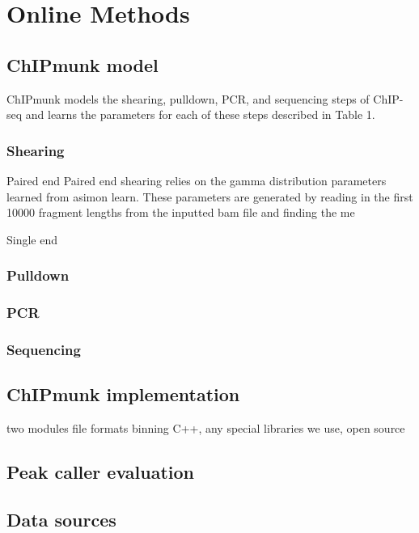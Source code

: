 \documentclass[12pt]{article}
\begin{document}
\section*{Online Methods}

\subsection*{ChIPmunk model}

ChIPmunk models the shearing, pulldown, PCR, and sequencing steps of ChIP-seq and learns the parameters for each of these steps described in Table 1. 

\subsubsection*{Shearing}

Paired end
Paired end shearing relies on the gamma distribution parameters learned from asimon learn. These parameters are generated by reading in the first 10000 fragment lengths from the inputted bam file and finding the me 

Single end


\subsubsection*{Pulldown}

\subsubsection*{PCR}

\subsubsection*{Sequencing}

\subsection*{ChIPmunk implementation}

two modules
file formats
binning
C++, any special libraries we use, open source

\subsection*{Peak caller evaluation}

\subsection*{Data sources}
\end{document}
